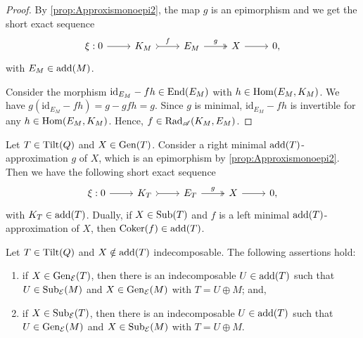 \begin{proof}
By \cref{prop:Approxismonoepi2}, the map $g$ is an epimorphism and we get the short exact sequence
\[\begin{tikzcd}
	\xi : 0 & K_M & E_M  & X &  0,
	\arrow[from=1-1, to=1-2]
	\arrow["f",tail, from=1-2, to=1-3]
	\arrow["g",two heads,from=1-3, to=1-4]
	\arrow[from=1-4, to=1-5]
    \end{tikzcd} \] with $E_M \in \operatorname{add}(M)$.

Consider the morphism $\text{id}_{E_M} - fh \in \operatorname{End}(E_M)$ with $h \in \operatorname{Hom}(E_M,K_M)$. We have $g(\text{id}_{E_M} - fh) = g - gfh = g$. Since $g$ is minimal, $\text{id}_{E_M} - fh$ is invertible for any $h \in \operatorname{Hom}(E_M,K_M)$. Hence, $f \in \operatorname{Rad}_{\mathscr{A}}(K_M,E_M)$.
\end{proof}

\begin{lemma} \label{lem:Ibra} 
    Let $T \in \operatorname{Tilt}(Q)$ and $X \in \operatorname{Gen}(T)$. Consider a right minimal $\operatorname{add}(T)$-approximation $g$ of $X$, which is an epimorphism by \cref{prop:Approxismonoepi2}. Then we have the following short exact sequence 
    \[\begin{tikzcd}
	\xi : 0 & K_T & E_T  & X &  0,
	\arrow[from=1-1, to=1-2]
	\arrow[tail, from=1-2, to=1-3]
	\arrow["g",two heads,from=1-3, to=1-4]
	\arrow[from=1-4, to=1-5]
    \end{tikzcd} \]
    with $K_T \in \operatorname{add}(T)$. Dually, if $ X \in \operatorname{Sub}(T)$ and $f$ is a left minimal $\operatorname{add}(T)$-approximation of $X$, then $\operatorname{Coker}(f) \in \operatorname{add}(T)$.
\end{lemma}


\begin{lemma} \label{lem:UinSubXinGen}
Let $T\in\operatorname{Tilt}(Q)$ and $X \notin \operatorname{add}(T)$ indecomposable. The following assertions hold:
\begin{enumerate}[label=$(\roman*)$, itemsep=1mm]
    \item if $X \in \operatorname{Gen}_\mathcal{E}(T)$, then there is an indecomposable $U \in \operatorname{add}(T)$ such that $U \in \operatorname{Sub}_\mathcal{E}(M)$ and $X \in \operatorname{Gen}_\mathcal{E}(M)$ with $T = U \oplus M$; and,
    \item if $X \in \operatorname{Sub}_\mathcal{E}(T)$, then there is an indecomposable $U \in \operatorname{add}(T)$ such that $U \in \operatorname{Gen}_\mathcal{E}(M)$ and $X \in \operatorname{Sub}_\mathcal{E}(M)$ with $T = U \oplus M$.
\end{enumerate}
\end{lemma}
 

